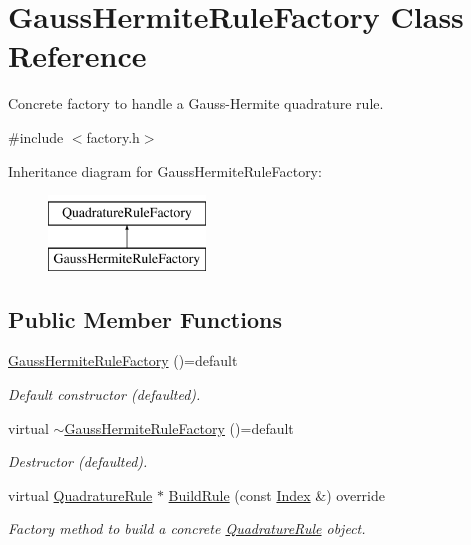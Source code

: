 \hypertarget{classGaussHermiteRuleFactory}{\section{Gauss\-Hermite\-Rule\-Factory Class Reference}
\label{classGaussHermiteRuleFactory}
}


Concrete factory to handle a Gauss-\/\-Hermite quadrature rule.  




{\ttfamily \#include $<$factory.\-h$>$}

Inheritance diagram for Gauss\-Hermite\-Rule\-Factory\-:\begin{figure}[H]
\begin{center}
\leavevmode
\includegraphics[height=2.000000cm]{classGaussHermiteRuleFactory}
\end{center}
\end{figure}
\subsection*{Public Member Functions}
\begin{DoxyCompactItemize}
\item 
\hypertarget{classGaussHermiteRuleFactory_a192b5732878d8393276226a4f359f1cd}{\hyperlink{classGaussHermiteRuleFactory_a192b5732878d8393276226a4f359f1cd}{Gauss\-Hermite\-Rule\-Factory} ()=default}\label{classGaussHermiteRuleFactory_a192b5732878d8393276226a4f359f1cd}

\begin{DoxyCompactList}\small\item\em Default constructor (defaulted). \end{DoxyCompactList}\item 
\hypertarget{classGaussHermiteRuleFactory_ae01722716cbf1c2d540f8d8079208b92}{virtual \hyperlink{classGaussHermiteRuleFactory_ae01722716cbf1c2d540f8d8079208b92}{$\sim$\-Gauss\-Hermite\-Rule\-Factory} ()=default}\label{classGaussHermiteRuleFactory_ae01722716cbf1c2d540f8d8079208b92}

\begin{DoxyCompactList}\small\item\em Destructor (defaulted). \end{DoxyCompactList}\item 
virtual \hyperlink{classQuadratureRule}{Quadrature\-Rule} $\ast$ \hyperlink{classGaussHermiteRuleFactory_a1e907a5209041516fa18c86c79fb1ec6}{Build\-Rule} (const \hyperlink{typedefs_8h_a2c726f8f32697958e9d6c2afecda531d}{Index} \&) override
\begin{DoxyCompactList}\small\item\em Factory method to build a concrete \hyperlink{classQuadratureRule}{Quadrature\-Rule} object. \end{DoxyCompactList}\end{DoxyCompactItemize}


